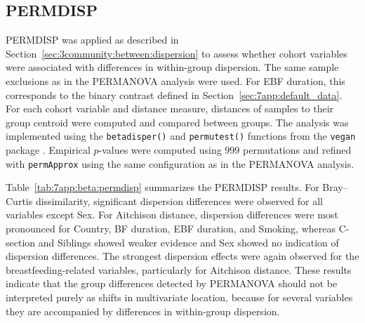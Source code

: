 \subsection{PERMDISP}
\label{sec:7app:beta:permdisp}

PERMDISP was applied as described in Section~\ref{sec:3community:between:dispersion} to assess whether cohort variables were associated with differences in within-group dispersion. The same sample exclusions as in the PERMANOVA analysis were used. For EBF duration, this corresponds to the binary contrast defined in Section~\ref{sec:7app:default_data}. For each cohort variable and distance measure, distances of samples to their group centroid were computed and compared between groups. The analysis was implemented using the \texttt{betadisper()} and \texttt{permutest()} functions from the \texttt{vegan} package \citep{oksanen2024vegan}. Empirical $p$-values were computed using $999$ permutations and refined with \texttt{permApprox} using the same configuration as in the PERMANOVA analysis.

Table~\ref{tab:7app:beta:permdisp} summarizes the PERMDISP results. For Bray--Curtis dissimilarity, significant dispersion differences were observed for all variables except Sex. For Aitchison distance, dispersion differences were most pronounced for Country, BF duration, EBF duration, and Smoking, whereas C-section and Siblings showed weaker evidence and Sex showed no indication of dispersion differences. The strongest dispersion effects were again observed for the breastfeeding-related variables, particularly for Aitchison distance. These results indicate that the group differences detected by PERMANOVA should not be interpreted purely as shifts in multivariate location, because for several variables they are accompanied by differences in within-group dispersion.

